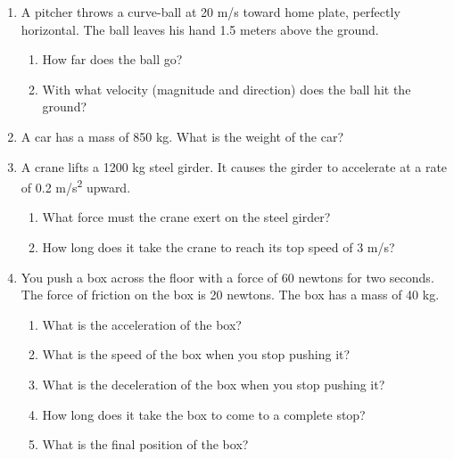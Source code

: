 \documentclass[letterpaper, 12pt]{article}
\begin{document}
\begin{enumerate}
\item  A pitcher throws a curve-ball at 20 m/s toward home plate, perfectly horizontal.  The ball leaves his hand 1.5 meters above the ground.  
\begin{enumerate}
	\item How far does the ball go?
	\vspace{0.4in}
	\item With what velocity (magnitude and direction) does the ball hit the ground?
	\vspace{0.4in}
\end{enumerate}


\item A car has a mass of 850 kg.  What is the weight of the car?
\vspace{0.4in}


\item A crane lifts a 1200 kg steel girder.  It causes the girder to accelerate at a rate of 0.2 m/s\textsuperscript{2} upward. 
\begin{enumerate}
	\item What force must the crane exert on the steel girder?
	\vspace{0.4in}
	\item How long does it take the crane to reach its top speed of 3 m/s?

\end{enumerate}

\pagebreak


\item You push a box across the floor with a force of 60 newtons for two seconds.  The force of friction on the box is 20 newtons.  The box has a mass of 40 kg.  
\begin{enumerate}
	\item What is the acceleration of the box?
	\vspace{0.4in}
	\item What is the speed of the box when you stop pushing it?
	\vspace{0.4in}
	\item What is the deceleration of the box when you stop pushing it?
	\vspace{0.4in}
	\item How long does it take the box to come to a complete stop?
	\vspace{0.4in}
	\item What is the final position of the box?
	\vspace{0.4in}
\end{enumerate}


\end{enumerate}
\end{document}
